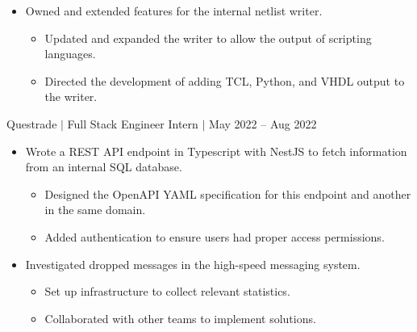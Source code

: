 \documentclass[12pt]{article}
\newcommand{\textDate}[3]{\noindent#1 $|$ #2 $|$ {\color{textGray} #3}}
\begin{document}
\begin{small}
\begin{itemize}
            \item {Owned and extended features for the internal netlist writer.}
                \begin{itemize}[label=$\circ$,topsep=-5px,partopsep=0px]
                    \itemsep0em 
                    \item {Updated and expanded the writer to allow the output of scripting languages.}
                    \item {Directed the development of adding TCL, Python, and VHDL output to the writer.}
                \end{itemize}

        \end{itemize}
    \end{small}


    \textDate{Questrade}{Full Stack Engineer Intern}{May 2022 -- Aug 2022}
    \begin{small}
        \begin{itemize}
            \itemsep0em 
            \item {Wrote a REST API endpoint in Typescript with NestJS to fetch information from an internal SQL database.}
                \begin{itemize}[label=$\circ$,topsep=-5px,partopsep=0px]
                    \itemsep0em 
                    \item {Designed the OpenAPI YAML specification for this endpoint and another in the same domain.}
                    \item {Added authentication to ensure users had proper access permissions.}
                \end{itemize}
            \item {Investigated dropped messages in the high-speed messaging system.}
                \begin{itemize}[label=$\circ$,topsep=-5px,partopsep=0px]
                    \itemsep0em 
                    \item {Set up infrastructure to collect relevant statistics.}
                    \item {Collaborated with other teams to implement solutions.}
                \end{itemize}
        \end{itemize}
    \end{small}
\end{document}
